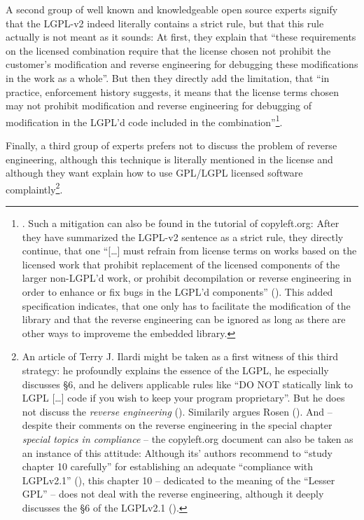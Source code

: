 A second group of well known and knowledgeable open source experts signify that
the LGPL-v2 indeed literally contains a strict rule, but that this rule actually
is not meant as it sounds: At first, they explain that \enquote{these
requirements on the licensed combination require that the license chosen not
prohibit the customer’s modification and reverse engineering for debugging these
modifications in the work as a whole}. But then they directly add the
limitation, that \enquote{in practice, enforcement history suggests, it means
that the license terms chosen may not prohibit modification and reverse
engineering for debugging of modification in the LGPL’d code included in the
combination}\footnote{\cite[cf.][\nopage wp., chapter LGPLv2.1, section
6]{MogCho2014a}. Such a mitigation can also be found in the tutorial of
copyleft.org: After they have summarized the LGPL-v2 sentence as a strict rule,
they directly continue, that one \enquote{[\ldots] must refrain from license
terms on works based on the licensed work that prohibit replacement of the
licensed components of the larger non-LGPL'd work, or prohibit decompilation or
reverse engineering in order to enhance or fix bugs in the LGPL'd components}
(\cite[cf.][86]{KuhSebGin2014a}). This added specification indicates, that one
only has to facilitate the modification of the library and that the reverse
engineering can be ignored as long as there are other ways to improveme the
embedded library.}.

Finally, a third group of experts prefers not to discuss the problem of reverse
engineering, although this technique is literally mentioned in the license and
although they want explain how to use GPL/LGPL licensed software
complaintly\footnote{An article of Terry J. Ilardi might be taken as a first
witness of this third strategy: he profoundly explains the essence of the LGPL,
he especially discusses §6, and he delivers applicable rules like \enquote{DO
NOT statically link to LGPL [\ldots] code if you wish to keep your program
proprietary}. But he does not discuss the \emph{reverse engineering}
(\cite[cf.][5f]{Ilardi2010a}). Similarily argues Rosen
(\cite[cf.][121ff]{Rosen2005a}). And -- despite their comments on the reverse
engineering in the special chapter \emph{special topics in compliance} -- the
copyleft.org document can also be taken as an instance of this attitude:
Although its' authors recommend to \enquote{study chapter 10 carefully} for
establishing an adequate \enquote{compliance with LGPLv2.1}
(\cite[cf.][86]{KuhSebGin2014a}), this chapter 10 -- dedicated to the meaning of
the \enquote{Lesser GPL} -- does not deal with the reverse engineering, although
it deeply discusses the §6 of the LGPLv2.1 (\cite[cf.][56ff, esp.
60f]{KuhSebGin2014a}).}.

